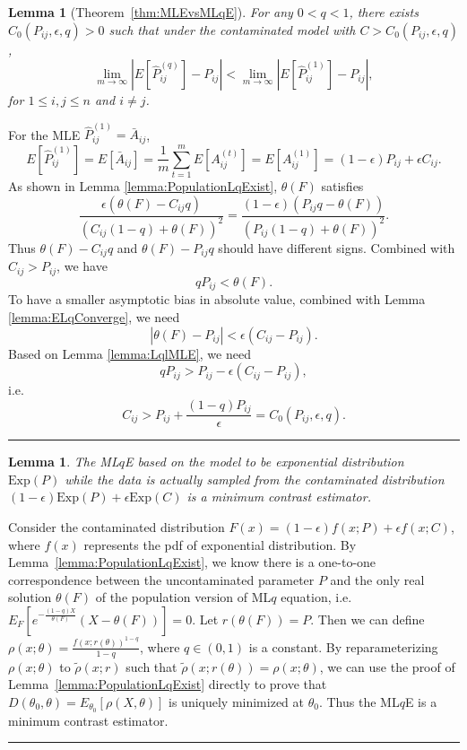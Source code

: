 \documentclass[a4paper]{article}
\newenvironment{proof}{{\bf Proof:  }}{\hfill\rule{2mm}{2mm}}
\newtheorem{lemma}[fact]{Lemma}
\renewcommand{\hat}{\widehat}
\begin{document}
\begin{lemma}[Theorem~\ref{thm:MLEvsMLqE}]
\label{lemma:ELqlEMLEproof}
For any $0 < q < 1$, there exists $C_0(P_{ij}, \epsilon, q) > 0$ such that under the contaminated model with $C > C_0(P_{ij}, \epsilon, q)$,
\[
	\lim_{m \to \infty} \left| E[\hat{P}^{(q)}_{ij}] - P_{ij} \right| < 
    \lim_{m \to \infty} \left| E[\hat{P}^{(1)}_{ij}] - P_{ij} \right|,
\]
for $1 \le i, j \le n$ and $i \ne j$.
\end{lemma}
\begin{proof}
For the MLE $\hat{P}^{(1)}_{ij} = \bar{A}_{ij}$,
\[
	E[\hat{P}^{(1)}_{ij}] = E[\bar{A}_{ij}]
    = \frac{1}{m} \sum_{t = 1}^m E[A_{ij}^{(t)}]
    = E[A_{ij}^{(1)}]
    = (1-\epsilon) P_{ij} + \epsilon C_{ij}.
\]
As shown in Lemma \ref{lemma:PopulationLqExist}, $\theta(F)$ satisfies
\[
\frac{\epsilon (\theta(F) - C_{ij}q)}{(C_{ij}(1-q) + \theta(F))^2} =
\frac{(1-\epsilon) (P_{ij} q - \theta(F))}{(P_{ij}(1-q) + \theta(F))^2}.
\]
Thus $\theta(F) - C_{ij} q$ and $\theta(F) - P_{ij} q$ should have different signs. Combined with $C_{ij} > P_{ij}$, we have
\[
q P_{ij} < \theta(F).
\]
To have a smaller asymptotic bias in absolute value, combined with Lemma \ref{lemma:ELqConverge}, we need
\[
|\theta(F) - P_{ij}| < \epsilon (C_{ij} - P_{ij}).
\]
Based on Lemma \ref{lemma:LqlMLE}, we need
\[
q P_{ij} > P_{ij} - \epsilon(C_{ij} - P_{ij}),
\]
i.e.\
\[
C_{ij} > P_{ij} + \frac{(1-q) P_{ij}}{\epsilon} = C_0(P_{ij}, \epsilon, q).
\]
\end{proof}


\begin{lemma}
\label{lemma:minimumcontrast}
The ML$q$E based on the model to be exponential distribution $\mathrm{Exp}(P)$ while the data is actually sampled from the contaminated distribution $(1-\epsilon) \mathrm{Exp}(P) + \epsilon \mathrm{Exp}(C)$ is a minimum contrast estimator.
\end{lemma}
\begin{proof}
Consider the contaminated distribution $F(x) = (1-\epsilon) f(x; P) + \epsilon f(x; C)$, where $f(x)$ represents the pdf of exponential distribution. By Lemma~\ref{lemma:PopulationLqExist}, we know there is a one-to-one correspondence between the uncontaminated parameter $P$ and the only real solution $\theta(F)$ of the population version of ML$q$ equation,
i.e.\ $E_F[e^{-\frac{(1-q)X}{\theta(F)}}(X - \theta(F))] = 0$. Let $r(\theta(F)) = P$.
Then we can define $\rho(x; \theta) = \frac{f(x; r(\theta))^{1-q}}{1 - q}$, where $q \in (0, 1)$ is a constant.
By reparameterizing $\rho(x; \theta)$ to $\widetilde{\rho}(x; r)$ such that $\widetilde{\rho}(x; r(\theta)) = \rho(x; \theta)$, we can use the proof of Lemma~\ref{lemma:PopulationLqExist} directly to prove that $D(\theta_0, \theta) = E_{\theta_0}[\rho(X, \theta)]$ is uniquely minimized at $\theta_0$. Thus the ML$q$E is a minimum contrast estimator.
\end{proof}
\end{document}
